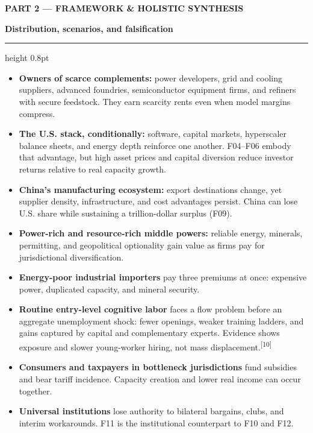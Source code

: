 \documentclass[10pt,letterpaper]{article}
\newcommand{\src}[1]{\textsuperscript{\color{accent}[#1]}}
\newcommand{\eyebrow}[1]{{\sffamily\fontsize{7.8}{9}\selectfont\color{accent}\bfseries\MakeUppercase{#1}}}
\newcommand{\pagetitle}[1]{{\fontsize{20}{22}\selectfont\bfseries #1\par}\vspace{1pt}\color{accent}\hrule height 0.8pt\color{ink}\vspace{4pt}}
\newcommand{\tighthead}[1]{\vspace{4pt}{\sffamily\fontsize{9.4}{10.8}\selectfont\color{ink}\bfseries #1}\par\vspace{1pt}}
\begin{document}
\newpage

\eyebrow{Part 2 --- Framework \& Holistic Synthesis}

\pagetitle{Distribution, scenarios, and falsification}

\begin{minipage}[t]{0.485\textwidth}
\vspace{0pt}
\tighthead{Who wins}
\begin{itemize}[leftmargin=1.0em,itemsep=2.5pt,topsep=1pt]
  \item \textbf{Owners of scarce complements:} power developers, grid and
  cooling suppliers, advanced foundries, semiconductor equipment firms, and
  refiners with secure feedstock. They earn scarcity rents even when model
  margins compress.
  \item \textbf{The U.S. stack, conditionally:} software, capital markets,
  hyperscaler balance sheets, and energy depth reinforce one another. F04--F06
  embody that advantage, but high asset prices and capital diversion reduce
  investor returns relative to real capacity growth.
  \item \textbf{China's manufacturing ecosystem:} export destinations change,
  yet supplier density, infrastructure, and cost advantages persist. China can
  lose U.S. share while sustaining a trillion-dollar surplus (F09).
  \item \textbf{Power-rich and resource-rich middle powers:} reliable energy,
  minerals, permitting, and geopolitical optionality gain value as firms pay
  for jurisdictional diversification.
\end{itemize}
\end{minipage}\hfill
\begin{minipage}[t]{0.485\textwidth}
\vspace{0pt}
\tighthead{Who loses}
\begin{itemize}[leftmargin=1.0em,itemsep=2.5pt,topsep=1pt]
  \item \textbf{Energy-poor industrial importers} pay three premiums at once:
  expensive power, duplicated capacity, and mineral security.
  \item \textbf{Routine entry-level cognitive labor} faces a flow problem
  before an aggregate unemployment shock: fewer openings, weaker training
  ladders, and gains captured by capital and complementary experts. Evidence
  shows exposure and slower young-worker hiring, not mass displacement.\src{10}
  \item \textbf{Consumers and taxpayers in bottleneck jurisdictions} fund
  subsidies and bear tariff incidence. Capacity creation and lower real income
  can occur together.
  \item \textbf{Universal institutions} lose authority to bilateral bargains,
  clubs, and interim workarounds. F11 is the institutional counterpart to F10
  and F12.
\end{itemize}
\end{minipage}
\end{document}
